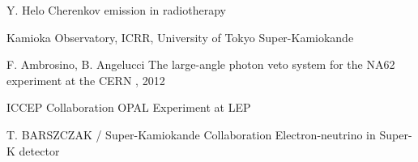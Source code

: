 \documentclass[aspectratio=1610, 10pt]{beamer}
\begin{document}
\begin{frame}[allowframebreaks]
\begin{thebibliography}{10}
            Y. Helo
            \newblock  Cherenkov emission in radiotherapy

            Kamioka Observatory, ICRR, University of Tokyo
            \newblock  Super-Kamiokande

            F. Ambrosino, B. Angelucci
            \newblock  The large-angle photon veto system for the NA62 experiment at the CERN
            , 2012

            ICCEP Collaboration
            \newblock OPAL Experiment at LEP

            T. BARSZCZAK / Super-Kamiokande Collaboration
            \newblock Electron-neutrino in Super-K detector
      \end{thebibliography}
\end{frame}
\end{document}
